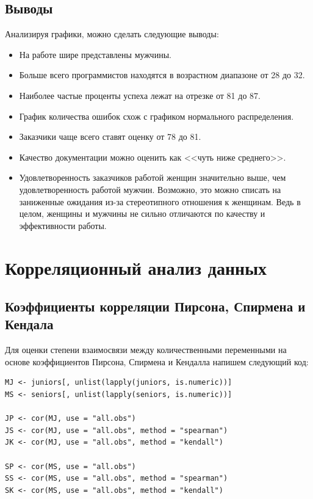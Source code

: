 \subsection{Выводы}

Анализируя графики, можно сделать следующие выводы:

\begin{itemize}
	\item На работе шире представлены мужчины.
	\item Больше всего программистов находятся в возрастном диапазоне от 28 до 32.
	\item Наиболее частые проценты успеха лежат на отрезке от 81 до 87.
	\item График количества ошибок схож с графиком нормального распределения.
	\item Заказчики чаще всего ставят оценку от 78 до 81.
	\item Качество документации можно оценить как <<чуть ниже среднего>>.
	\item Удовлетворенность заказчиков работой женщин значительно выше, чем удовлетворенность работой мужчин. Возможно, это можно списать на заниженные ожидания из-за стереотипного отношения к женщинам. Ведь в целом, женщины и мужчины не сильно отличаются по качеству и эффективности работы.
\end{itemize}












\section{Корреляционный анализ данных}

\subsection{Коэффициенты корреляции Пирсона, Спирмена и Кендала}

Для оценки степени взаимосвязи между количественными переменными на основе коэффициентов Пирсона, Спирмена и Кендалла напишем следующий код:

\begin{verbatim}
MJ <- juniors[, unlist(lapply(juniors, is.numeric))]
MS <- seniors[, unlist(lapply(seniors, is.numeric))]

JP <- cor(MJ, use = "all.obs")
JS <- cor(MJ, use = "all.obs", method = "spearman")
JK <- cor(MJ, use = "all.obs", method = "kendall")

SP <- cor(MS, use = "all.obs")
SS <- cor(MS, use = "all.obs", method = "spearman")
SK <- cor(MS, use = "all.obs", method = "kendall")
\end{verbatim}



